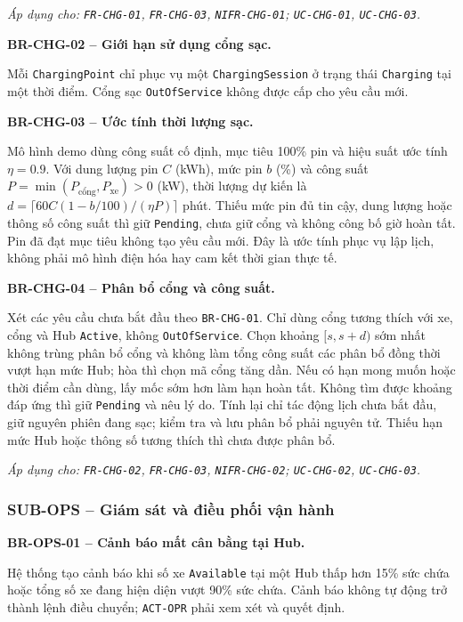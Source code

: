 \textit{Áp dụng cho: \texttt{FR-CHG-01}, \texttt{FR-CHG-03}, \texttt{NIFR-CHG-01}; \texttt{UC-CHG-01}, \texttt{UC-CHG-03}.}

\medskip
\noindent\textbf{BR-CHG-02 -- Giới hạn sử dụng cổng sạc.}\par
\nopagebreak[4]
Mỗi \texttt{ChargingPoint} chỉ phục vụ một \texttt{ChargingSession} ở trạng thái \texttt{Charging} tại một thời điểm. Cổng sạc \texttt{OutOfService} không được cấp cho yêu cầu mới.

\medskip
\noindent\textbf{BR-CHG-03 -- Ước tính thời lượng sạc.}\par
\nopagebreak[4]
Mô hình demo dùng công suất cố định, mục tiêu 100\% pin và hiệu suất ước tính $\eta=0.9$. Với dung lượng pin $C$ (kWh), mức pin $b$ (\%) và công suất $P=\min(P_{\text{cổng}},P_{\text{xe}})>0$ (kW), thời lượng dự kiến là $d=\lceil60C(1-b/100)/(\eta P)\rceil$ phút. Thiếu mức pin đủ tin cậy, dung lượng hoặc thông số công suất thì giữ \texttt{Pending}, chưa giữ cổng và không công bố giờ hoàn tất. Pin đã đạt mục tiêu không tạo yêu cầu mới. Đây là ước tính phục vụ lập lịch, không phải mô hình điện hóa hay cam kết thời gian thực tế.

\medskip
\noindent\textbf{BR-CHG-04 -- Phân bổ cổng và công suất.}\par
\nopagebreak[4]
Xét các yêu cầu chưa bắt đầu theo \texttt{BR-CHG-01}. Chỉ dùng cổng tương thích với xe, cổng và Hub \texttt{Active}, không \texttt{OutOfService}. Chọn khoảng $[s,s+d)$ sớm nhất không trùng phân bổ cổng và không làm tổng công suất các phân bổ đồng thời vượt hạn mức Hub; hòa thì chọn mã cổng tăng dần. Nếu có hạn mong muốn hoặc thời điểm cần dùng, lấy mốc sớm hơn làm hạn hoàn tất. Không tìm được khoảng đáp ứng thì giữ \texttt{Pending} và nêu lý do. Tính lại chỉ tác động lịch chưa bắt đầu, giữ nguyên phiên đang sạc; kiểm tra và lưu phân bổ phải nguyên tử. Thiếu hạn mức Hub hoặc thông số tương thích thì chưa được phân bổ.

\textit{Áp dụng cho: \texttt{FR-CHG-02}, \texttt{FR-CHG-03}, \texttt{NIFR-CHG-02}; \texttt{UC-CHG-02}, \texttt{UC-CHG-03}.}

\subsubsection{SUB-OPS -- Giám sát và điều phối vận hành}

\noindent\textbf{BR-OPS-01 -- Cảnh báo mất cân bằng tại Hub.}\par
\nopagebreak[4]
Hệ thống tạo cảnh báo khi số xe \texttt{Available} tại một Hub thấp hơn 15\% sức chứa hoặc tổng số xe đang hiện diện vượt 90\% sức chứa. Cảnh báo không tự động trở thành lệnh điều chuyển; \texttt{ACT-OPR} phải xem xét và quyết định.

